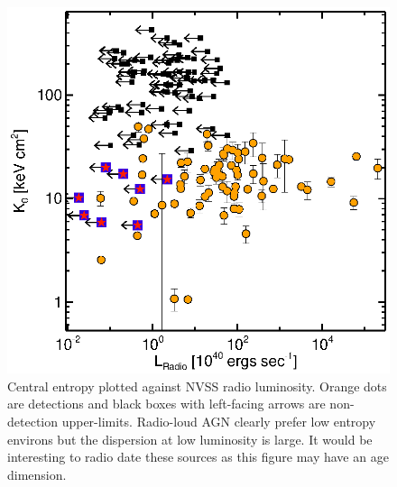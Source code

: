 \documentclass[11pt]{article}
\begin{document}
\begin{figure}[t]
\begin{minipage}[t]{0.5\linewidth}
        \includegraphics*[width=\textwidth, trim=28mm 8mm 30mm 10mm, clip]{k0rad}
        \caption{\small Central entropy plotted against NVSS radio
        luminosity. Orange dots are detections and black boxes with left-facing
        arrows are non-detection upper-limits. Radio-loud AGN clearly
        prefer low entropy environs but the dispersion at low luminosity is
        large. It would be interesting to radio date these sources as this
        figure may have an age dimension.}
        \label{fig:rad}
    \end{minipage}
\end{figure}



 
\end{document}
